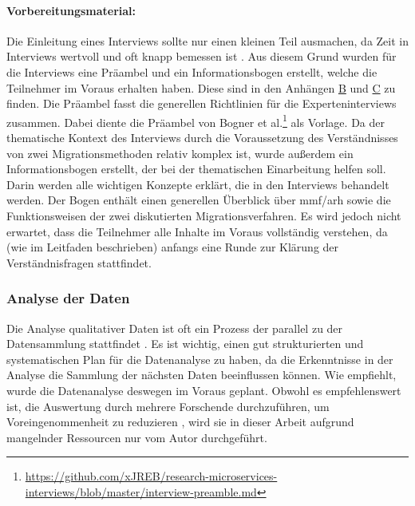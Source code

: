 \paragraph{Vorbereitungsmaterial:}
Die Einleitung eines Interviews sollte nur einen kleinen Teil ausmachen, da Zeit in Interviews wertvoll und oft knapp bemessen ist \cite{Runeson2009,hove-anda-2005,seaman2008qualitative}.
Aus diesem Grund wurden für die Interviews eine Präambel und ein Informationsbogen erstellt, welche die Teilnehmer im Voraus erhalten haben.
Diese sind in den Anhängen \hyperref[chap:expert-interviews-preamble]{B} und \hyperref[chap:expert-interviews-infobogen]{C} zu finden.
Die Prä\-am\-bel fasst die generellen Richtlinien für die Experteninterviews zusammen.
Dabei diente die Präambel von Bogner et al.\footnote{\url{https://github.com/xJREB/research-microservices-interviews/blob/master/interview-preamble.md}} als Vorlage.
Da der thematische Kontext des Interviews durch die Voraussetzung des Verständnisses von zwei Migrationsmethoden relativ komplex ist, wurde außerdem ein Informationsbogen erstellt, der bei der thematischen Einarbeitung helfen soll.
Darin werden alle wichtigen Konzepte erklärt, die in den Interviews behandelt werden.
Der Bogen enthält einen generellen Überblick über  \gls{mmf}/\gls{arh} sowie die Funktionsweisen der zwei diskutierten Migrationsverfahren.
Es wird jedoch nicht erwartet, dass die Teilnehmer alle Inhalte im Voraus vollständig verstehen, da (wie im Leitfaden beschrieben) anfangs eine Runde zur Klärung der Verständnisfragen stattfindet.

\subsubsection{Analyse der Daten}

Die Analyse qualitativer Daten ist oft ein Prozess der parallel zu der Datensammlung stattfindet \cite{Runeson2009}.
Es ist wichtig, einen gut strukturierten und systematischen Plan für die Datenanalyse zu haben, da die Erkenntnisse in der Analyse die Sammlung der nächsten Daten beeinflussen können.
Wie  empfiehlt, wurde die Datenanalyse deswegen im Voraus geplant.
Obwohl es empfehlenswert ist, die Auswertung durch mehrere Forschende durchzuführen, um Voreingenommenheit zu reduzieren \cite{Runeson2009}, wird sie in dieser Arbeit aufgrund mangelnder Ressourcen nur vom Autor durchgeführt.

